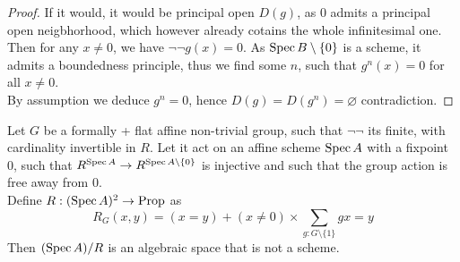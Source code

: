 \begin{proof}
	If it would, it would be principal open $D(g)$, as 0 admits a principal open neigbhorhood, which however already cotains the whole infinitesimal one. \\
	Then for any $x \neq 0$, we have $\lnot \lnot g(x) = 0$. As $\operatorname{Spec} B \setminus \{0\}$ is a scheme, it admits a boundedness principle, thus we find some $n$, such that $g^n (x) = 0$ for all $x \neq 0$. \\ %
	By assumption we deduce $g^n =0$, hence $D(g) = D(g^n) = \varnothing$ contradiction.
\end{proof}
\begin{prop}
	Let $G$ be a formally \etale + flat affine non-trivial group, such that $\lnot \lnot$ its finite, with cardinality invertible in $R$. 
	Let it act on an affine scheme $\operatorname{Spec} A$ with a fixpoint 0, such that  $R^{\operatorname{Spec} A} \to R^{\operatorname{Spec} A \setminus \{0\}}$ is injective and such that the group action is free away from 0. \\
Define $R: (\operatorname{Spec} A)^2\to \operatorname{Prop}$ as
\[
R_G(x,y) = (x = y) + (x \neq 0) \times \sum_{g : G \setminus \{1\}} g x = y
\]
	Then $(\operatorname{Spec} A) / R$ is an algebraic space that is not a scheme.
\end{prop}
